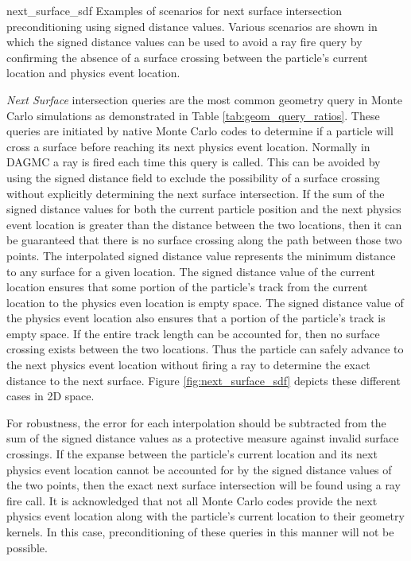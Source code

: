              {next_surface_sdf}
             {Examples of scenarios for next surface intersection
               preconditioning using signed distance values. Various scenarios
               are shown in which the signed distance values can be used to
               avoid a ray fire query by confirming the absence of a surface
               crossing between the particle's current location and physics
               event location. } {
               \textit{Next Surface} intersection queries are the most common
               geometry query in Monte Carlo simulations as demonstrated in
               Table \ref{tab:geom_query_ratios}. These queries are initiated by
               native Monte Carlo codes to determine if a particle will cross a
               surface before reaching its next physics event location. Normally
               in DAGMC a ray is fired each time this query is called. This can
               be avoided by using the signed distance field to exclude the
               possibility of a surface crossing without explicitly determining
               the next surface intersection. If the sum of the signed distance
               values for both the current particle position and the next
               physics event location is greater than the distance between the
               two locations, then it can be guaranteed that there is no surface
               crossing along the path between those two points. The
               interpolated signed distance value represents the minimum
               distance to any surface for a given location. The signed distance
               value of the current location ensures that some portion of the
               particle's track from the current location to the physics even
               location is empty space. The signed distance value of the physics
               event location also ensures that a portion of the particle's
               track is empty space. If the entire track length can be accounted
               for, then no surface crossing exists between the two
               locations. Thus the particle can safely advance to the next
               physics event location without firing a ray to determine the
               exact distance to the next surface. Figure
               \ref{fig:next_surface_sdf} depicts these different cases in 2D
               space.
               
               For robustness, the error for each interpolation should be
               subtracted from the sum of the signed distance values as a
               protective measure against invalid surface crossings. If the
               expanse between the particle's current location and its next
               physics event location cannot be accounted for by the signed
               distance values of the two points, then the exact next surface
               intersection will be found using a ray fire
               call. It is acknowledged that not all
               Monte Carlo codes provide the next physics event location along
               with the particle's current location to their geometry
               kernels. In this case, preconditioning of these queries in this
               manner will not be possible.
              }

